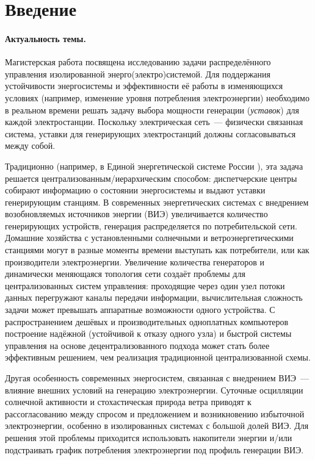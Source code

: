 \section*{Введение}

\paragraph{Актуальность темы.}
Магистерская работа посвящена исследованию задачи распределённого управления изолированной энерго(электро)системой.
Для поддержания устойчивости энергосистемы и эффективности её работы в изменяющихся условиях (например, изменение уровня потребления электроэнергии) необходимо в реальном времени решать задачу выбора мощности генерации (\textit{уставок}) для каждой электростанции.
Поскольку электрическая сеть~--- физически связанная система, уставки для генерирующих электростанций должны согласовываться между собой.

Традиционно (например, в Единой энергетической системе России \cite{eesfreqpower}), эта задача решается централизованным/иерархическим способом: диспетчерские центры собирают информацию о состоянии энергосистемы и выдают уставки генерирующим станциям.
В современных энергетических системах с внедрением возобновляемых источников энергии (ВИЭ) увеличивается количество генерирующих устройств, генерация распределяется по потребительской сети.
Домашние хозяйства с установленными солнечными и ветроэнергетическими станциями могут в разные моменты времени выступать как потребители, или как производители электроэнергии.
Увеличение количества генераторов и динамически меняющаяся топология сети создаёт проблемы для централизованных систем управления: проходящие через один узел потоки данных перегружают каналы передачи информации, вычислительная сложность задачи может превышать аппаратные возможности одного устройства.
С распространением дешёвых и производительных одноплатных компьютеров построение надёжной (устойчивой к отказу одного узла) и быстрой системы управления на основе децентрализованного подхода может стать более эффективным решением, чем реализация традиционной централизованной схемы.

Другая особенность современных энергосистем, связанная с внедрением ВИЭ~--- влияние внешних условий на генерацию электроэнергии.
Суточные осцилляции солнечной активности и стохастическая природа ветра приводят к рассогласованию между спросом и предложением и возникновению избыточной электроэнергии, особенно в изолированных системах с большой долей ВИЭ.
Для решения этой проблемы приходится использовать накопители энергии и/или подстраивать график потребления электроэнергии под профиль генерации ВИЭ.

